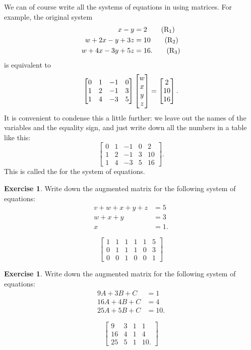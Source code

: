 \documentclass[a4paper]{book}
\theoremstyle{definition}
\newtheorem{exercise}[theorem]{Exercise}
\renewenvironment{solution}{\SolutionInline}{\endSolutionInline}
\begin{document}
We can of course write all the systems of equations in
 using matrices.  For example, the original
system
\begin{align*}
 x-y       &= 2   \tag{R${}_1$}\\
 w+2x-y+3z &= 10  \tag{R${}_2$}\\
 w+4x-3y+5z&= 16. \tag{R${}_3$}
\end{align*}
is equivalent to 
\[ \begin{bmatrix}
    0 & 1 & -1 & 0 \\
    1 & 2 & -1 & 3 \\
    1 & 4 & -3 & 5
   \end{bmatrix} 
   \begin{bmatrix} w \\ x \\ y \\ z \end{bmatrix} = 
   \begin{bmatrix} 2 \\ 10 \\ 16 \end{bmatrix}.
\]
It is convenient to condense this a little further: we leave out the
names of the variables and the equality sign, and just write down all
the numbers in a table like this:
\[ \left[\begin{array}{cccc|c}
    0 & 1 & -1 & 0 & 2  \\
    1 & 2 & -1 & 3 & 10 \\
    1 & 4 & -3 & 5 & 16
   \end{array}\right].
\]
This is called the  for the system of
equations.  
\begin{exercise}
 Write down the augmented matrix for the following system of
 equations:
 \begin{align*}
  v+w+x+y+z &= 5 \\
    w+x+y   &= 3 \\
      x     &= 1. 
 \end{align*}
\end{exercise}
\begin{solution}
 \[ \left[\begin{array}{ccccc|c}
     1 & 1 & 1 & 1 & 1 & 5 \\
     0 & 1 & 1 & 1 & 0 & 3 \\
     0 & 0 & 1 & 0 & 0 & 1
    \end{array}\right]
 \]
\end{solution}
\begin{exercise}
 Write down the augmented matrix for the following system of
 equations:
 \begin{align*}
  9A + 3B + C &= 1 \\
  16A + 4B + C &= 4 \\
  25A + 5B + C &= 10.   
 \end{align*}
\end{exercise}
\begin{solution}
 \[ \left[\begin{array}{ccc|c}
     9  & 3 & 1 & 1 \\
     16 & 4 & 1 & 4 \\
     25 & 5 & 1 & 10.
    \end{array}\right]
 \]
\end{solution}
\end{document}
